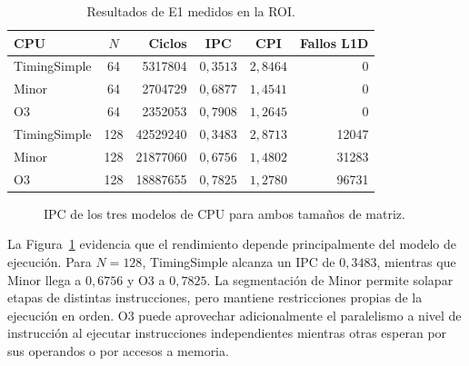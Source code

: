 \documentclass[journal]{IEEEtran}
\begin{document}
\begin{table}[!t]
\centering
\caption{Resultados de E1 medidos en la ROI.}
\label{tab:e1}
\footnotesize
\setlength{\tabcolsep}{3pt}
\begin{tabular}{|l|c|r|c|c|r|}
\hline
\textbf{CPU} & $N$ & \textbf{Ciclos} &
\textbf{IPC} & \textbf{CPI} & \textbf{Fallos L1D} \\ \hline
TimingSimple & 64  & \num{5317804}  & $0{,}3513$ & $2{,}8464$ & 0 \\ \hline
Minor        & 64  & \num{2704729}  & $0{,}6877$ & $1{,}4541$ & 0 \\ \hline
O3           & 64  & \num{2352053}  & $0{,}7908$ & $1{,}2645$ & 0 \\ \hline
TimingSimple & 128 & \num{42529240} & $0{,}3483$ & $2{,}8713$ &
\num{12047} \\ \hline
Minor        & 128 & \num{21877060} & $0{,}6756$ & $1{,}4802$ &
\num{31283} \\ \hline
O3           & 128 & \num{18887655} & $0{,}7825$ & $1{,}2780$ &
\num{96731} \\ \hline
\end{tabular}
\end{table}

\begin{figure}[!t]
\centering
{}
\caption{IPC de los tres modelos de CPU para ambos tamaños de matriz.}
\label{fig:e1_ipc}
\end{figure}

La Figura~\ref{fig:e1_ipc} evidencia que el rendimiento depende
principalmente del modelo de ejecución. Para $N=128$, TimingSimple
alcanza un IPC de $0{,}3483$, mientras que Minor llega a $0{,}6756$
y O3 a $0{,}7825$. La segmentación de Minor permite solapar etapas
de distintas instrucciones, pero mantiene restricciones propias de
la ejecución en orden. O3 puede aprovechar adicionalmente el
paralelismo a nivel de instrucción al ejecutar instrucciones
independientes mientras otras esperan por sus operandos o por
accesos a memoria.
\end{document}
